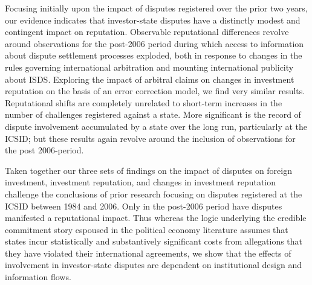 \documentclass[12pt,onesided]{amsart}
\begin{document}
Focusing initially upon the impact of disputes registered over the prior two years, our evidence indicates that investor-state disputes have a distinctly modest and contingent impact on reputation. Observable reputational differences revolve around observations for the post-2006 period during which access to information about dispute settlement processes exploded, both in response to changes in the rules governing international arbitration and mounting international publicity about ISDS. Exploring the impact of arbitral claims on changes in investment reputation on the basis of an error correction model, we find very similar results. Reputational shifts are completely unrelated to short-term increases in the number of challenges registered against a state. More significant is the record of dispute involvement accumulated by a state over the long run, particularly at the ICSID; but these results again revolve around the inclusion of observations for the post 2006-period.

Taken together our three sets of findings on the impact of disputes on foreign investment, investment reputation, and changes in investment reputation challenge the conclusions of prior research focusing on disputes registered at the ICSID between 1984 and 2006. Only in the post-2006 period have disputes manifested a reputational impact. Thus whereas the logic underlying the credible commitment story espoused in the political economy literature assumes that states incur statistically and substantively significant costs from allegations that they have violated their international agreements, we show that the effects of involvement in investor-state disputes are dependent on institutional design and information flows.
\end{document}
